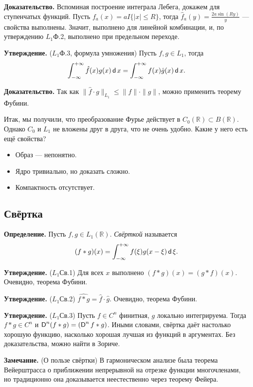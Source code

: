 \textbf{Доказательство.} Вспоминая построение интеграла Лебега, докажем для ступенчатых функций.
Пусть $f_a(x) = a I\{|x| \le R\}$, тогда $\hat f_a(y) = \frac{2a \sin (Ry)}{y}$ --- свойства выполнены.
Значит, выполнено для линейной комбинации, и, по утверждению $L_1$Ф.2, выполнено при предельном переходе.

\QED

\textbf{Утверждение.} ($L_1$Ф.3, формула умножения) Пусть $f, g \in L_1$, тогда
\[
    \int_{-\infty}^{+\infty} \hat f(x) g(x) \operatorname{\mathsf d} x = \int_{-\infty}^{+\infty} f(x) \hat g(x) \operatorname{\mathsf d} x.
\]

\textbf{Доказательство.} Так как $\|\hat f \cdot g\|_{L_1} \le \|f\| \cdot \|g\|$, можно применить теорему Фубини.

\QED

Итак, мы получили, что преобразование Фурье действует в $C_0(\mathbb R) \subset B(\mathbb R)$.
Однако $C_0$ и $L_1$ не вложены друг в друга, что не очень удобно.
Какие у него есть ещё свойства?
\begin{itemize}
    \item Образ --- непонятно.
    \item Ядро тривиально, но доказать сложно.
    \item Компактность отсутствует.
\end{itemize}

\subsection{Свёртка}

\textbf{Определение.} Пусть $f, g \in L_1(\mathbb R)$. \textit{Свёрткой} называется
\[
    (f * g)(x) = \int_{-\infty}^{+\infty} f(\xi) g(x - \xi) \operatorname{\mathsf d} \xi.
\]

\textbf{Утверждение.} ($L_1$Св.1) Для всех $x$ выполнено $(f * g)(x) = (g * f)(x)$.
Очевидно, теорема Фубини.

\textbf{Утверждение.} ($L_1$Св.2) $\widehat{f * g} = \hat f \cdot \hat g$.
Очевидно, теорема Фубини.

\textbf{Утверждение.} ($L_1$Св.3) Пусть $f \in C^n$ финитная, $g$ локально интегрируема.
Тогда $f * g \in C^n$ и $\operatorname{\mathsf D}^n(f * g) = (\operatorname{\mathsf D}^n f * g)$.
Иными словами, свёртка даёт настолько хорошую функцию, насколько хорошая лучшая из функций в аргументах.
Без доказательства, можно найти в Зориче.

\textbf{Замечание.} (О пользе свёртки) В гармоническом анализе была теорема Вейерштрасса о приближении непрерывной на отрезке функции многочленами, но традиционно она доказывается неестественно через теорему Фейера.

